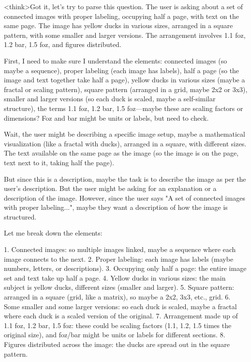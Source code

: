 <think>Got it, let's try to parse this question. The user is asking about a set of connected images with proper labeling, occupying half a page, with text on the same page. The image has yellow ducks in various sizes, arranged in a square pattern, with some smaller and larger versions. The arrangement involves 1.1 foz, 1.2 bar, 1.5 foz, and figures distributed. 

First, I need to make sure I understand the elements: connected images (so maybe a sequence), proper labeling (each image has labels), half a page (so the image and text together take half a page), yellow ducks in various sizes (maybe a fractal or scaling pattern), square pattern (arranged in a grid, maybe 2x2 or 3x3), smaller and larger versions (so each duck is scaled, maybe a self-similar structure), the terms 1.1 foz, 1.2 bar, 1.5 foz—maybe these are scaling factors or dimensions? Foz and bar might be units or labels, but need to check. 

Wait, the user might be describing a specific image setup, maybe a mathematical visualization (like a fractal with ducks), arranged in a square, with different sizes. The text available on the same page as the image (so the image is on the page, text next to it, taking half the page). 

But since this is a description, maybe the task is to describe the image as per the user's description. But the user might be asking for an explanation or a description of the image. However, since the user says "A set of connected images with proper labeling...", maybe they want a description of how the image is structured. 

Let me break down the elements:

1. Connected images: so multiple images linked, maybe a sequence where each image connects to the next.
2. Proper labeling: each image has labels (maybe numbers, letters, or descriptions).
3. Occupying only half a page: the entire image set and text take up half a page.
4. Yellow ducks in various sizes: the main subject is yellow ducks, different sizes (smaller and larger).
5. Square pattern: arranged in a square (grid, like a matrix), so maybe a 2x2, 3x3, etc., grid.
6. Some smaller and some larger versions: so each duck is scaled, maybe a fractal where each duck is a scaled version of the original.
7. Arrangement made up of 1.1 foz, 1.2 bar, 1.5 foz: these could be scaling factors (1.1, 1.2, 1.5 times the original size), and foz/bar might be units or labels for different sections.
8. Figures distributed across the image: the ducks are spread out in the square pattern.

